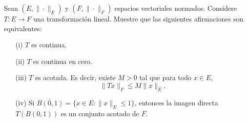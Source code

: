 Sean $(E, \| \cdot \|_E)$ y $(F, \| \cdot \|_F)$ espacios vectoriales normados. Considere  
$T : E \to F$ una transformación lineal. Muestre que las siguientes afirmaciones son equivalentes:
\begin{enumerate}
    \item[(i)] $T$ es continua.
    \item[(ii)] $T$ es continua en cero.
    \item[(iii)] $T$ es acotada. Es decir, existe $M > 0$ tal que para todo $x \in E$,  
    \[
    \|T x\|_F \leq M \|x\|_E.
    \]
    \item[(iv)] Si $\overline{B(0,1)} = \{x \in E : \|x\|_E \leq 1\}$, entonces la imagen directa $T(B(0,1))$ es un conjunto acotado de $F$.
\end{enumerate}




